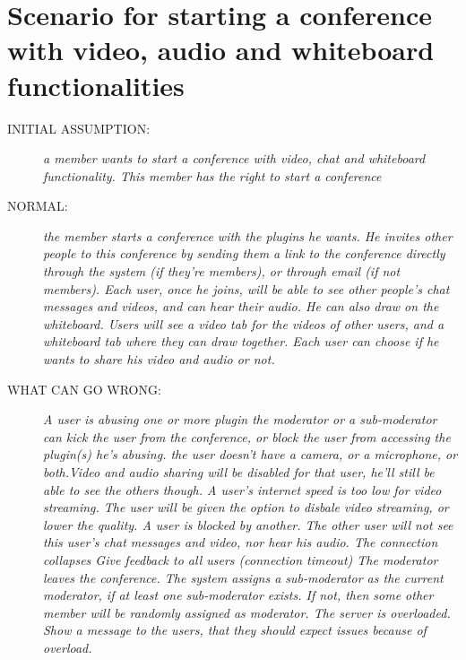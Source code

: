 \section{Scenario for starting a conference with video, audio and whiteboard functionalities}
\begin{description}
 \item [INITIAL ASSUMPTION:]
  \textit{a member wants to start a conference with video, chat and whiteboard functionality. This member has the right to start a conference}

 \item [NORMAL:]
  \textit{the member starts a conference with the plugins he wants.\newline
He invites other people to this conference by sending them a link to the conference directly through
the system (if they're members), or through email (if not members).\newline
Each user, once he joins, will be able to see other people's chat messages and videos, and can hear their audio. He can also draw on the whiteboard.\newline
Users will see a video tab for the videos of other users, and a whiteboard tab where they can draw together.\newline
Each user can choose if he wants to share his video and audio or not.}


 \item [WHAT CAN GO WRONG:]

  \textit{A user is abusing one or more plugin
  the moderator or a sub-moderator can kick the user from the conference, or block the user from accessing the plugin(s) he's abusing.\newline
  the user doesn't have a camera, or a microphone, or both.Video and audio sharing will be disabled for that user, he'll still be able to see the others though. \newline
  A user's internet speed is too low for video streaming. The user will be given the option to disbale video streaming, or lower the quality. \newline
  A user is blocked by another. The other user will not see this user's chat messages and video, nor hear his audio.\newline
  The connection collapses
  Give feedback to all users (connection timeout)\newline
  The moderator leaves the conference. The system assigns a sub-moderator as the current moderator, if at least one sub-moderator exists. If not, then some other member will be randomly assigned as moderator.\newline
  The server is overloaded. Show a message to the users, that they should expect issues because of overload.\newline}


\end{description}

